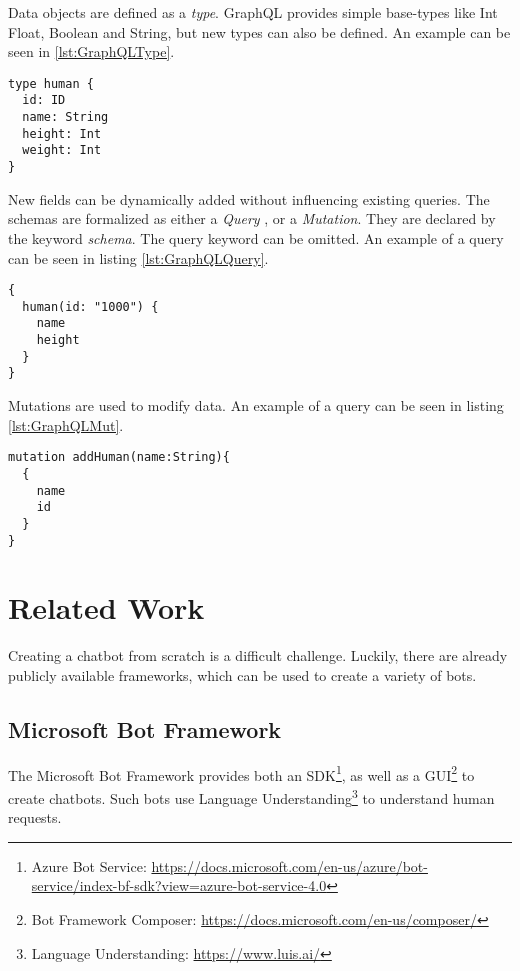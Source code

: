 Data objects are defined as a \emph{type}. GraphQL provides simple base-types like Int Float, Boolean and String, but new types can also be defined. An example can be seen in \ref{lst:GraphQLType}.
\begin{lstlisting}[caption={Example of a GraphQL schema},captionpos=b,label={lst:GraphQLType}]
type human {
  id: ID
  name: String
  height: Int
  weight: Int
}
\end{lstlisting}
New fields can be dynamically added without influencing existing queries. The schemas are formalized as either a \emph{Query }, or a \emph{Mutation}. They are declared by the keyword \emph{schema}. The query keyword can be omitted. An example of a query can be seen in listing \ref{lst:GraphQLQuery}.
\begin{lstlisting}[caption={Example of a GraphQL Query},captionpos=b,label={lst:GraphQLQuery}]
{
  human(id: "1000") {
    name
    height
  }
}
\end{lstlisting}
Mutations are used to modify data. An example of a query can be seen in listing \ref{lst:GraphQLMut}.
\begin{lstlisting}[caption={Example of a GraphQL Mutation},captionpos=b,label={lst:GraphQLMut}]
mutation addHuman(name:String){
  {
    name
    id
  }
}
\end{lstlisting}

\section{Related Work} \label{lab:relWork}

Creating a chatbot from scratch is a difficult challenge. Luckily, there are already publicly available frameworks, which can be used to create a variety of bots.

\subsection{Microsoft Bot Framework}
The Microsoft Bot Framework provides both an SDK\footnote{Azure Bot Service: \href{https://docs.microsoft.com/en-us/azure/bot-service/index-bf-sdk?view=azure-bot-service-4.0}{https://docs.microsoft.com/en-us/azure/bot-service/index-bf-sdk?view=azure-bot-service-4.0}}, as well as a GUI\footnote{Bot Framework Composer: \href{https://docs.microsoft.com/en-us/composer/}{https://docs.microsoft.com/en-us/composer/}} to create chatbots. Such bots use Language Understanding\footnote{Language Understanding: \href{https://www.luis.ai/}{https://www.luis.ai/}} to understand human requests.

